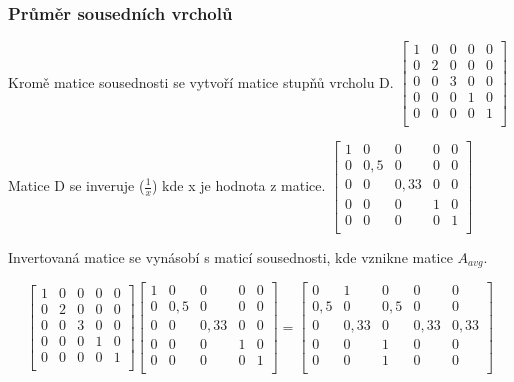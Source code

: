 \subsubsection{Průměr sousedních vrcholů}

Kromě matice sousednosti se vytvoří matice stupňů vrcholu D.
$\left[ \begin{matrix}
1 & 0 & 0 & 0 & 0 \\
0 & 2 & 0 & 0 & 0 \\
0 & 0 & 3 & 0 & 0 \\
0 & 0 & 0 & 1 & 0 \\
0 & 0 & 0 & 0 & 1 \\
\end{matrix} \right]$

Matice D se inveruje ($\frac{1}{x}$) kde x je hodnota z matice.
$\left[ \begin{matrix}
1 & 0 & 0 & 0 & 0 \\
0 & 0,5 & 0 & 0 & 0 \\
0 & 0 & 0,33 & 0 & 0 \\
0 & 0 & 0 & 1 & 0 \\
0 & 0 & 0 & 0 & 1 \\
\end{matrix} \right]$

Invertovaná matice se vynásobí s maticí sousednosti, kde vznikne matice $A_{avg}$.

\[
\left[ \begin{matrix}
1 & 0 & 0 & 0 & 0 \\
0 & 2 & 0 & 0 & 0 \\
0 & 0 & 3 & 0 & 0 \\
0 & 0 & 0 & 1 & 0 \\
0 & 0 & 0 & 0 & 1 \\
\end{matrix} \right]
\left[ \begin{matrix}
1 & 0 & 0 & 0 & 0 \\
0 & 0,5 & 0 & 0 & 0 \\
0 & 0 & 0,33 & 0 & 0 \\
0 & 0 & 0 & 1 & 0 \\
0 & 0 & 0 & 0 & 1 \\
\end{matrix} \right] =
\left[ \begin{matrix}
0 & 1 & 0 & 0 & 0 \\
0,5 & 0 & 0,5 & 0 & 0 \\
0 & 0,33 & 0 & 0,33 & 0,33 \\
0 & 0 & 1 & 0 & 0 \\
0 & 0 & 1 & 0 & 0 \\
\end{matrix} \right]
\]

